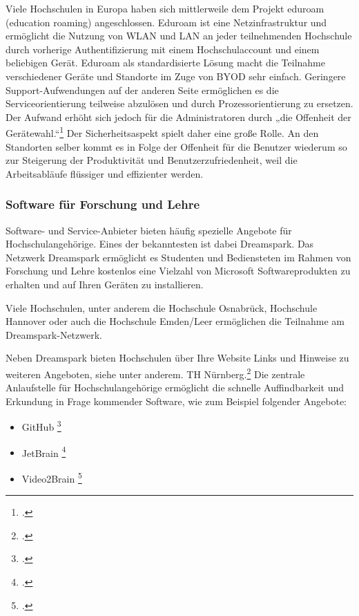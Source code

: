 Viele Hochschulen in Europa haben sich mittlerweile dem Projekt eduroam (education roaming) angeschlossen. Eduroam ist eine Netzinfrastruktur und ermöglicht die Nutzung von WLAN und LAN an jeder teilnehmenden Hochschule durch vorherige Authentifizierung mit einem Hochschulaccount und einem beliebigen Gerät.
Eduroam als standardisierte Lösung macht die Teilnahme verschiedener Geräte und Standorte im Zuge von BYOD sehr einfach. Geringere Support-Aufwendungen auf der anderen Seite ermöglichen es die Serviceorientierung teilweise abzulösen und durch Prozessorientierung zu ersetzen. Der Aufwand erhöht sich jedoch für die Administratoren durch „die Offenheit der Gerätewahl.“\footcite{wickhill_byod_2013} Der Sicherheitsaspekt spielt daher eine große Rolle. An den Standorten selber kommt es in Folge der Offenheit für die Benutzer wiederum so zur Steigerung der Produktivität und Benutzerzufriedenheit, weil die Arbeitsabläufe flüssiger und effizienter werden.

\subsubsection{Software für Forschung und Lehre}
\label{software_forschung_lehre}
Software- und Service-Anbieter bieten häufig spezielle Angebote für Hochschulangehörige. Eines der bekanntesten ist dabei Dreamspark. Das Netzwerk Dreamspark ermöglicht es Studenten und Bediensteten im Rahmen von Forschung und Lehre kostenlos eine Vielzahl von Microsoft Softwareprodukten zu erhalten und auf Ihren Geräten zu installieren.

Viele Hochschulen, unter anderem die Hochschule Osnabrück, Hochschule Hannover oder auch die Hochschule Emden/Leer ermöglichen die Teilnahme am Dreamspark-Netzwerk.

Neben Dreamspark bieten Hochschulen über Ihre Website Links und Hinweise zu weiteren Angeboten, siehe unter anderem. TH Nürnberg.\footcite{thnuernberg_software_2015} Die zentrale Anlaufstelle für Hochschulangehörige ermöglicht die schnelle Auffindbarkeit und Erkundung in Frage kommender Software, wie zum Beispiel folgender Angebote:

\begin{itemize}
	\item GitHub \footcite{github_edu}
	\item JetBrain \footcite{jetbrains_edu}
	\item Video2Brain \footcite{video2brain_edu}
\end{itemize}



